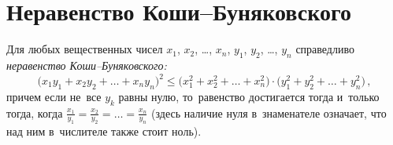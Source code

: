 
\section*{Неравенство Коши--Буняковского}


Для любых вещественных чисел
$x_{1}$, $x_{2}$, \ldots, $x_{n}$, $y_{1}$, $y_{2}$, \ldots, $y_{n}$
справедливо \emph{неравенство Коши--Буня\-ковс\-кого:}
\[
    \bigl( x_{1} y_{1} + x_{2} y_{2} + \ldots + x_{n} y_{n} \bigr)^2
\leq
    \bigl( x_{1}^2 + x_{2}^2 + \ldots + x_{n}^2 \bigr) \cdot
    \bigl( y_{1}^2 + y_{2}^2 + \ldots + y_{n}^2 \bigr)
\, , \]
причем если не~все $y_{k}$ равны нулю, то~равенство достигается тогда и~только
тогда, когда
\(
    \frac{x_{1}}{y_{1}} = \frac{x_{2}}{y_{2}} = \ldots = \frac{x_{n}}{y_{n}}
\)
(здесь наличие нуля в~знаменателе означает, что над ним в~числителе также
стоит ноль).

